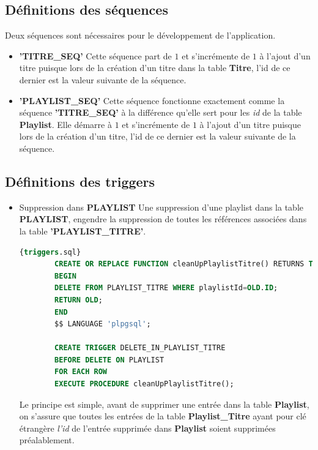 \documentclass[a4paper,12pt, french]{report}
\begin{document}
  \subsection{Définitions des séquences}
	  Deux séquences sont nécessaires pour le développement de l'application.
	  \begin{itemize}
	  	\item \textbf{'TITRE\_SEQ'}
		  	Cette séquence part de $1$ et s'incrémente de $1$ à l'ajout d'un titre puisque lors de la création d'un titre dans la table \textbf{Titre}, l'id de ce dernier est la valeur suivante de la séquence.
	  	\item \textbf{'PLAYLIST\_SEQ'}
		  	Cette séquence fonctionne exactement comme la séquence \textbf{'TITRE\_SEQ'} à la différence qu'elle sert pour les \emph{id} de la table \textbf{Playlist}. Elle démarre à $1$ et s'incrémente de $1$ à l'ajout d'un titre puisque lors de la création d'un titre, l'id de ce dernier est la valeur suivante de la séquence.
	  \end{itemize}
  \subsection{Définitions des triggers }
    \begin{itemize}
      \item Suppression dans \textbf{PLAYLIST} \newline
        Une suppression d'une playlist dans la table \textbf{PLAYLIST}, engendre la suppression de toutes les références associées dans la table \textbf{'PLAYLIST\_TITRE'}.
        \begin{lstlisting}[language=SQL, label=playlist-trigger,caption=Trigger sur la table Playlist, breaklines, frame=single]{triggers.sql}
        CREATE OR REPLACE FUNCTION cleanUpPlaylistTitre() RETURNS TRIGGER as $$
        BEGIN
        DELETE FROM PLAYLIST_TITRE WHERE playlistId=OLD.ID;
        RETURN OLD;
        END
        $$ LANGUAGE 'plpgsql';
        
        CREATE TRIGGER DELETE_IN_PLAYLIST_TITRE
        BEFORE DELETE ON PLAYLIST
        FOR EACH ROW
        EXECUTE PROCEDURE cleanUpPlaylistTitre();
        \end{lstlisting}
        Le principe est simple, avant de supprimer une entrée dans la table \textbf{Playlist}, on s'assure que toutes les entrées de la table \textbf{Playlist\_Titre} ayant pour clé étrangère \emph{l'id} de l'entrée supprimée dans \textbf{Playlist} soient supprimées préalablement.
    \end{itemize}
\end{document}
